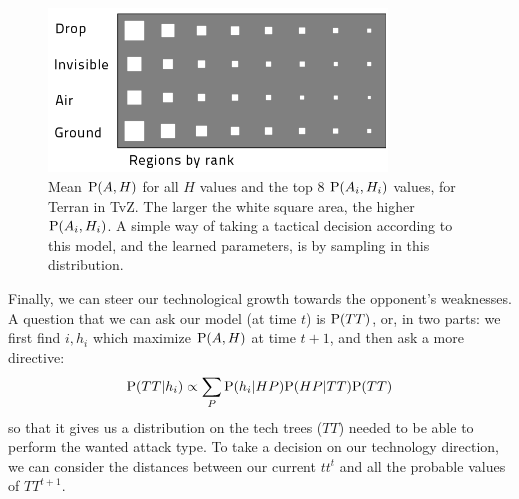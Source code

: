 \begin{figure}[htp]
\centerline{\includegraphics[width=9cm]{images/WhereHow_T_TvZ_light.png}}
\caption{Mean $\mathrm{P}(A,H)$ for all $H$ values and the top 8 $\mathrm{P}(A_i,H_i)$ values, for Terran in TvZ. The larger the white square area, the higher $\mathrm{P}(A_i,H_i)$. A simple way of taking a tactical decision according to this model, and the learned parameters, is by sampling in this distribution.}
\label{fig:WhereHow}
\end{figure}

Finally, we can steer our technological growth towards the opponent's weaknesses. A question that we can ask our model (at time $t$) is $\mathrm{P}(TT)$, or, in two parts: we first find $i,h_i$ which maximize $\mathrm{P}(A,H)$ at time $t+1$, and then ask a more directive:
$$\mathrm{P}(TT|h_i) \propto \sum_{P} \mathrm{P}(h_i|HP)\mathrm{P}(HP|TT)\mathrm{P}(TT)$$
so that it gives us a distribution on the tech trees ($TT$) needed to be able to perform the wanted attack type. To take a decision on our technology direction, we can consider the distances between our current $tt^t$ and all the probable values of $TT^{t+1}$.

